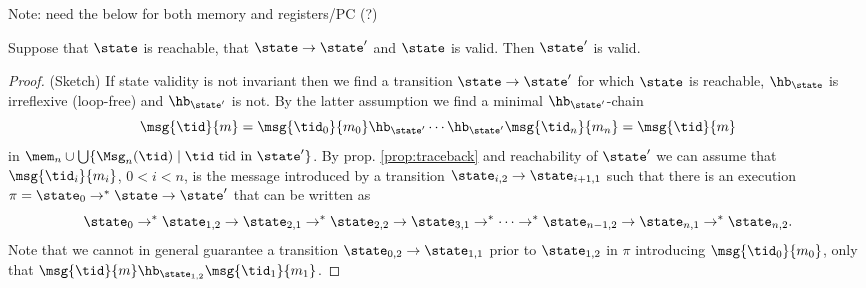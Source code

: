 Note: need the below for both memory and registers/PC (?)

\begin{theorem}
\label{thm:validityPreservation}
Suppose that $\state$ is reachable, that $\state\rightarrow \state'$ and $\state$ is valid. Then $\state'$ is valid.
\end{theorem}
\begin{proof}
(Sketch)
If state validity is not invariant then we find a transition
$\state\rightarrow \state'$ for which $\state$ is reachable, $\hb_{\state}$ is irreflexive (loop-free) and $\hb_{\state'}$ is not.
By the latter assumption we find a minimal $\hb_{\state'}$-chain
\begin{equation}
\label{eq:chain}
\msg{\tid}{m} = \msg{\tid_0}{m_0}\hb_{\state'}\cdots \hb_{\state'}\msg{\tid_n}{m_n} = \msg{\tid}{m}
\end{equation}
in $\mem_n\cup\bigcup\{\Msg_n(\tid)\mid \tid\mbox{ tid in }\state'\}$.
By prop. \ref{prop:traceback} and reachability of $\state'$ we can assume that $\msg{\tid_i}{m_i}$, $0 < i < n$, is the message introduced by a transition
$\state_{i,2}\rightarrow \state_{i+1,1}$ such that there is an execution
$\pi = \state_0\rightarrow^* \state\rightarrow\state'$ that can be written as
\begin{equation}
\label{eq:chaincomp}
\state_0\rightarrow^*\state_{1,2}\rightarrow\state_{2,1}\rightarrow^*\state_{2,2}\rightarrow\state_{3,1}\rightarrow^* \cdots \rightarrow^*\state_{n-1,2}\rightarrow \state_{n,1}\rightarrow^*\state_{n,2}.
\end{equation}
Note that we cannot in general guarantee
a transition $\state_{0,2}\rightarrow\state_{1,1}$ prior to $\state_{1,2}$ in $\pi$ introducing $\msg{\tid_0}{m_0}$, only that $\msg{\tid}{m}\hb_{\state_{1,2}}\msg{\tid_1}{m_1}$.


\end{proof}
